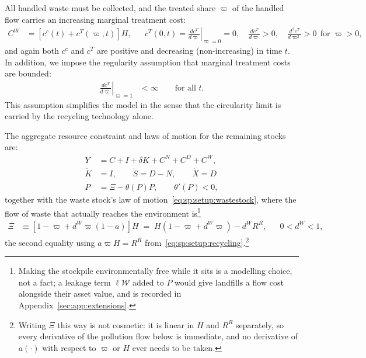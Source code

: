  All handled waste must be collected, and the treated share $\varpi$ of the handled flow carries an increasing marginal treatment cost:
\begin{align}
C^W &= \left[c^c(t)+c^T(\varpi,t)\right]H,
&&
c^T(0,t)=\left.\frac{dc^T}{d\varpi}\right|_{\varpi=0}=0,\quad
\frac{dc^T}{d\varpi}>0,\quad \frac{d^2c^T}{d\varpi^2}>0 \ \ \text{for }\varpi>0,
\label{eq:sp:setup:waste-cost}
\end{align}
and again both $c^c$ and $c^T$ are positive and decreasing (non-increasing) in time $t$. In addition, we impose the regularity assumption that marginal treatment costs are bounded:
\begin{align}
\left.\frac{dc^T}{d\varpi}\right|_{\varpi=1} &< \infty \qquad\text{for all }t .
\label{eq:sp:setup:cT-finite}
\end{align}
This assumption simplifies the model in the sense that the circularity limit is carried by the recycling technology alone.


 The aggregate resource constraint and laws of motion for the remaining stocks are:
\begin{align}
Y &= C+I+\delta K+C^N+C^D+C^W, \label{eq:sp:setup:resource-constraint} \\
\dot K &= I, \qquad \dot S= D-N, \qquad \dot{X} = D \label{eq:sp:setup:reserves-motion} \\
\dot P &= \Xi-\theta(P)P, \qquad \theta'(P)<0,
\label{eq:sp:setup:pollution-motion}
\end{align}
together with the waste stock's law of motion~\eqref{eq:sp:setup:wastestock}, where the flow of waste that actually reaches the environment is\footnote{Making the stockpile environmentally free while it sits is a modelling choice, not a fact; a leakage term $\ell\mathcal W$ added to $\dot P$ would give landfills a flow cost alongside their asset value, and is recorded in Appendix~\ref{sec:app:extensions}.}
\begin{align}
\Xi &\equiv \left[1-\varpi+d^W\varpi\left(1-a\right)\right]H
\;=\; H\left(1-\varpi+d^W\varpi\right)-d^WR^R,
&&
0<d^W<1,
\label{eq:sp:setup:Xi}
\end{align}
the second equality using $a\varpi H=R^R$ from~\eqref{eq:sp:setup:recycling}.\footnote{Writing $\Xi$ this way is not cosmetic: it is linear in $H$ and $R^R$ separately, so every derivative of the pollution flow below is immediate, and no derivative of $a(\cdot)$ with respect to $\varpi$ or $H$ ever needs to be taken.}


